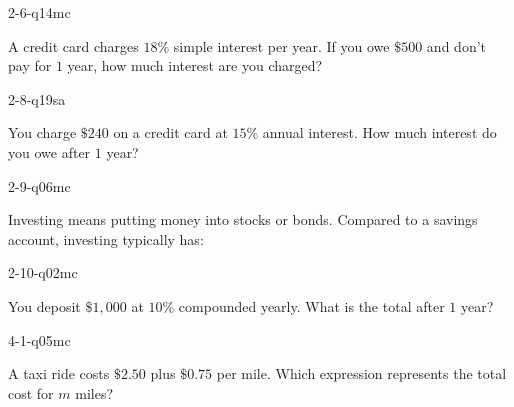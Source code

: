 \begin{practiceQuestion}{2-6-q14}{mc}
\begin{questionText}
A credit card charges $18\%$ simple interest per year. If you owe $\$500$ and don't pay for $1$ year, how much interest are you charged?
\end{questionText}
\end{practiceQuestion}

\begin{practiceQuestion}{2-8-q19}{sa}
\begin{questionText}
You charge $\$240$ on a credit card at $15\%$ annual interest. How much interest do you owe after $1$ year?
\end{questionText}
\end{practiceQuestion}

\begin{practiceQuestion}{2-9-q06}{mc}
\begin{questionText}
Investing means putting money into stocks or bonds. Compared to a savings account, investing typically has:
\end{questionText}
\end{practiceQuestion}

\begin{practiceQuestion}{2-10-q02}{mc}
\begin{questionText}
You deposit $\$1{,}000$ at $10\%$ compounded yearly. What is the total after $1$ year?
\end{questionText}
\end{practiceQuestion}

\begin{practiceQuestion}{4-1-q05}{mc}
\begin{questionText}
A taxi ride costs $\$2.50$ plus $\$0.75$ per mile. Which expression represents the total cost for $m$ miles?
\end{questionText}
\end{practiceQuestion}


